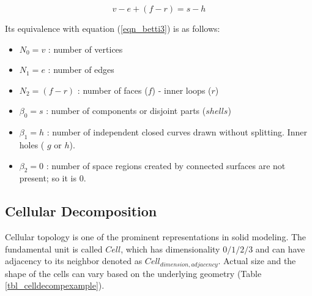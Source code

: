 \begin{equation}
v - e + (f - r) = s - h
\label{eqn_nonmanifold}
\end{equation}

Its equivalence with equation (\ref{eqn_betti3}) is as follows:

\begin{itemize}
[noitemsep,topsep=2pt,parsep=2pt,partopsep=2pt,label={}]
\item $N_{0} = v$ : number of vertices
\item $N_{1} = e$ : number of edges
\item $N_{2} = (f - r)$ : number of faces ($f$) -  inner loops ($r$)
\item $\beta_{0} = s$ : number of components or disjoint parts ($shells$)
\item $\beta_{1} = h$ : number of independent closed curves drawn without splitting. Inner holes ( $g$ or $h$). 
\item $\beta_{2} = 0$ : number of space regions created by connected surfaces are not present; so it is $0$.
\end{itemize}

\subsection{Cellular Decomposition}
Cellular topology is one of the prominent representations in solid modeling.  The  fundamental unit is called $Cell$, which has dimensionality $0/1/2/3$ and can have adjacency to its neighbor denoted as $Cell_{dimension,adjacency}$. Actual size and the shape of the cells can vary based on the underlying geometry (Table \ref{tbl_celldecompexample}). 


